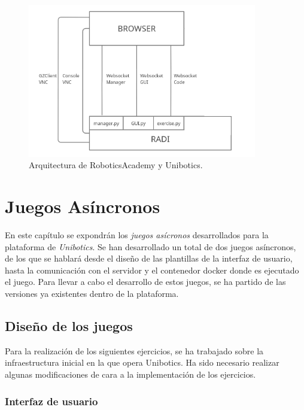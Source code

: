 \documentclass[a4paper, 12pt]{book}
\begin{document}
\begin{figure}[H]
	\centering
    \includegraphics[width=10cm]{img/robotics_academy_architecture.png}
    \caption{Arquitectura de RoboticsAcademy y Unibotics.}
    \label{figura:unibotics_architecture}
\end{figure}



\cleardoublepage
\chapter{Juegos Asíncronos}

En este capítulo se expondrán los \emph{juegos asícronos} desarrollados para la plataforma de \textit{Unibotics}. Se han desarrollado un total de dos juegos asíncronos, de los que se hablará desde el diseño de las plantillas de la interfaz de usuario, hasta la comunicación con el servidor y el contenedor docker donde es ejecutado el juego. Para llevar a cabo el desarrollo de estos juegos, se ha partido de las versiones ya existentes dentro de la plataforma.

\section{Diseño de los juegos}
\label{sec:async_infraestructura}

Para la realización de los siguientes ejercicios, se ha trabajado sobre la infraestructura inicial en la que opera Unibotics. Ha sido necesario realizar algunas modificaciones de cara a la implementación de los ejercicios. 

\subsection{Interfaz de usuario}
\end{document}
